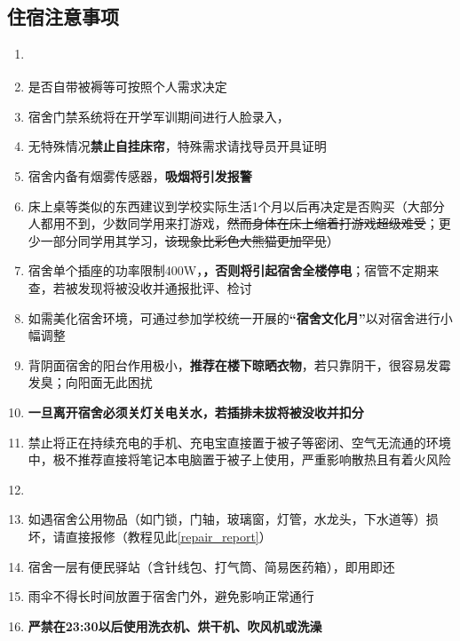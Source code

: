 \subsection[住宿注意事项]{住宿注意事项}
\begin{enumerate}
    \item \textbf{}
          \label{random_allocation}
    \item 是否自带被褥等可按照个人需求决定\footnotemark
    \item 宿舍门禁系统将在开学军训期间进行人脸录入，\textbf{}
    \item 无特殊情况\textbf{禁止自挂床帘}，特殊需求请找导员开具证明
    \item 宿舍内备有烟雾传感器，\textbf{吸烟将引发报警\footnotemark}
    \item 床上桌等类似的东西建议到学校实际生活1个月以后再决定是否购买（大部分人都用不到，少数同学用来打游戏，\sout{然而身体在床上缩着打游戏超级难受}；更少一部分同学用其学习，\sout{该现象\linebreak[3]比彩色大熊猫更加罕见}）
    \item 宿舍单个插座的功率限制400W\footnotemark，\textbf{，否则将引起宿舍全楼停电}；宿管不定期来查，若被发现将被没收并通报批评、检讨
    \item 如需美化宿舍环境，可通过参加学校统一开展的\textbf{“宿舍文化月”}\footnotemark 以对宿舍进行小幅调整
    \item 背阴面宿舍的阳台作用极小，\textbf{推荐在楼下晾晒衣物}，若只靠阴干，很容易发霉发臭；向阳面无此困扰
    \item \textbf{一旦离开宿舍必须关灯关电关水，若插排未拔将被没收并扣分}
    \item 禁止将正在持续充电的手机、充电宝直接置于被子等密闭、空气无流通的环境中，极不推荐直接将笔记本电脑置于被子上使用，严重影响散热且有着火风险
    \item \textbf{}\footnotemark
    \item 如遇宿舍公用物品（如门锁，门轴，玻璃窗，灯管，水龙头，下水道等）损坏，请直接报修（教程见此\uline{\ref{repair_report}}）
    \item 宿舍一层有便民驿站（含针线包、打气筒、简易医药箱），即用即还
    \item 雨伞不得长时间放置于宿舍门外，避免影响正常通行
    \item \textbf{严禁在23:30以后使用洗衣机、烘干机、吹风机或洗澡}
\end{enumerate}

